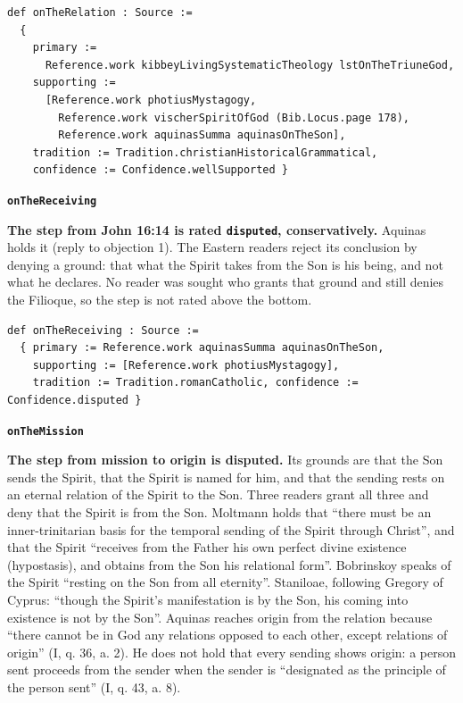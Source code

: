 \documentclass[11pt,paper=\testimonypaper,DIV=13,parskip=false]{scrartcl}
\begin{document}
{\small\begin{verbatim}
def onTheRelation : Source :=
  {
    primary :=
      Reference.work kibbeyLivingSystematicTheology lstOnTheTriuneGod,
    supporting :=
      [Reference.work photiusMystagogy,
        Reference.work vischerSpiritOfGod (Bib.Locus.page 178),
        Reference.work aquinasSumma aquinasOnTheSon],
    tradition := Tradition.christianHistoricalGrammatical,
    confidence := Confidence.wellSupported }
\end{verbatim}}
\par\medskip\noindent\textbf{\texttt{on\allowbreak{}The\allowbreak{}Receiving}}\par\nobreak\noindent
\textbf{The step from John 16:14 is rated \texttt{disputed}, conservatively.} Aquinas holds it (reply to objection 1). The Eastern readers reject its conclusion by denying a ground: that what the Spirit takes from the Son is his being, and not what he declares. No reader was sought who grants that ground and still denies the Filioque, so the step is not rated above the bottom.

{\small\begin{verbatim}
def onTheReceiving : Source :=
  { primary := Reference.work aquinasSumma aquinasOnTheSon,
    supporting := [Reference.work photiusMystagogy],
    tradition := Tradition.romanCatholic, confidence := Confidence.disputed }
\end{verbatim}}
\par\medskip\noindent\textbf{\texttt{on\allowbreak{}The\allowbreak{}Mission}}\par\nobreak\noindent
\textbf{The step from mission to origin is disputed.} Its grounds are that the Son sends the Spirit, that the Spirit is named for him, and that the sending rests on an eternal relation of the Spirit to the Son. Three readers grant all three and deny that the Spirit is from the Son. Moltmann holds that “there must be an inner-trinitarian basis for the temporal sending of the Spirit through Christ”, and that the Spirit “receives from the Father his own perfect divine existence (hypostasis), and obtains from the Son his relational form”. Bobrinskoy speaks of the Spirit “resting on the Son from all eternity”. Staniloae, following Gregory of Cyprus: “though the Spirit’s manifestation is by the Son, his coming into existence is not by the Son”. Aquinas reaches origin from the relation because “there cannot be in God any relations opposed to each other, except relations of origin” (I, q. 36, a. 2). He does not hold that every sending shows origin: a person sent proceeds from the sender when the sender is “designated as the principle of the person sent” (I, q. 43, a. 8).
\end{document}
